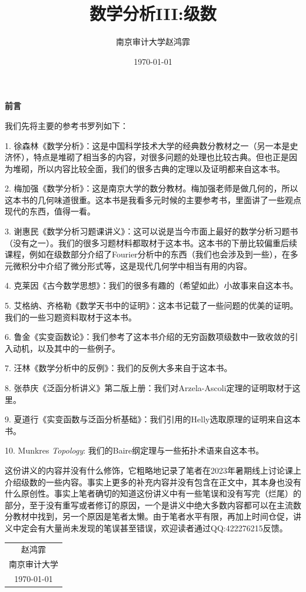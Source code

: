 \documentclass{article}
\title{\textbf{数学分析III:级数}}
\author{南京审计大学\hspace{0.5cm}赵鸿霏}
\date{\today}
\begin{document}
\maketitle
\tableofcontents
\newpage
\begin{center}
\begin{huge}
     \textbf{前言}
\end{huge}
\end{center}
我们先将主要的参考书罗列如下：\par
1. 徐森林《数学分析》：这是中国科学技术大学的经典数分教材之一（另一本是史济怀），特点是堆砌了相当多的内容，对很多问题的处理也比较古典。但也正是因为堆砌，所以内容比较全面，我们的很多古典的定理以及证明都来自这本书。\par
2. 梅加强《数学分析》：这是南京大学的数分教材。梅加强老师是做几何的，所以这本书的几何味道很重。这本书是我看多元时候的主要参考书，里面讲了一些观点现代的东西，值得一看。\par
3. 谢惠民《数学分析习题课讲义》：这可以说是当今市面上最好的数学分析习题书（没有之一）。我们的很多习题材料都取材于这本书。这本书的下册比较偏重后续课程，例如在级数部分介绍了Fourier分析中的东西（我们也会涉及到一些），在多元微积分中介绍了微分形式等，这是现代几何学中相当有用的内容。\par
4. 克莱因《古今数学思想》：我们的很多有趣的（希望如此）小故事来自这本书。\par
5. 艾格纳、齐格勒《数学天书中的证明》：这本书记载了一些问题的优美的证明。我们的一些习题资料取材于这本书。\par
6. 鲁金《实变函数论》：我们参考了这本书介绍的无穷函数项级数中一致收敛的引入动机，以及其中的一些例子。\par
7. 汪林《数学分析中的反例》：我们的反例大多来自于这本书。\par
8. 张恭庆《泛函分析讲义》第二版上册：我们对Arzela-Ascoli定理的证明取材于这里。\par
9. 夏道行《实变函数与泛函分析基础》：我们引用的Helly选取原理的证明来自这本书。\par
10. Munkres \textit{Topology}: 我们的Baire纲定理与一些拓扑术语来自这本书。\par
这份讲义的内容并没有什么修饰，它粗略地记录了笔者在2023年暑期线上讨论课上介绍级数的一些内容。事实上更多的补充内容并没有包含在正文中，其本身也没有什么原创性。事实上笔者确切的知道这份讲义中有一些笔误和没有写完（烂尾）的部分，至于没有重写或者修订的原因，一个是讲义中绝大多数内容都可以在主流数分教材中找到，另一个原因是笔者太懒。由于笔者水平有限，再加上时间仓促，讲义中定会有大量尚未发现的笔误甚至错误，欢迎读者通过QQ:422276215反馈。
\begin{flushright}
    \begin{tabular}{c}
        赵鸿霏\\
        南京审计大学\\
        \today
    \end{tabular}
\end{flushright}
\newpage
\end{document}
